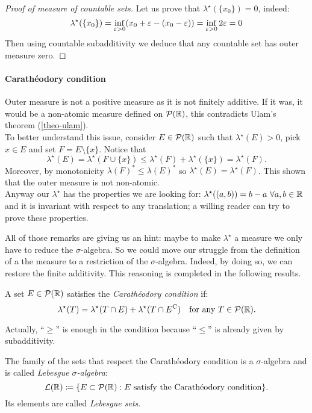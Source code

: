 \begin{proof}[Proof of measure of countable sets]
	Let us prove that $\lambda^{\star}(\{x_0\})=0$, indeed:
	$$
		\lambda^{\star}(\{x_0\})=\inf_{\varepsilon>0}(x_0+\varepsilon-(x_0-\varepsilon))=\inf_{\varepsilon>0}2\varepsilon=0
	$$
	Then using countable subadditivity we deduce that any countable set has outer measure zero.
\end{proof}

\paragraph{Carathéodory condition} Outer measure is not a positive measure as it is not finitely additive. If it was, it would be a non-atomic measure defined on $\mathcal P(\mathbb R)$, this contradicts Ulam's theorem (\vref{theo-ulam}).\\
To better understand this issue, consider $E \in \mathcal P(\mathbb R)$ such that $\lambda^\star(E)> 0$, pick $x \in E$ and set $F=E \setminus \{x\}$. Notice that 
$$
	\lambda^\star(E) 
	= \lambda^\star(F \cup \{x\}) \leq \lambda^\star(F) + \lambda^\star(\{x\}) 
	= \lambda^\star(F)
.
$$
Moreover, by monotonicity $\lambda(F)^* \leq \lambda(E)^*$ so $\lambda^\star(E) = \lambda^\star(F)$. This shown that the outer measure is not non-atomic.\\
Anyway our $\lambda^\star$ has the properties we are looking for: $\lambda^\star((a,b))  = b - a \ \forall a , b \in \mathbb R$ and it is invariant with respect to any translation; a willing reader can try to prove these properties.

All of those remarks are giving us an hint: maybe to make $\lambda^\star$ a measure we only have to reduce the $\sigma$-algebra. So we could move our struggle from the definition of a the measure to a restriction of the $\sigma$-algebra. Indeed, by doing so, we can restore the finite additivity. This reasoning is completed in the following results.

\begin{defn}
	A set $E \in \mathcal P(\mathbb R)$ satisfies the \emph{Carathéodory condition} if:
	$$
		\lambda^\star(T)
		= \lambda^\star(T\cap E) + \lambda^\star(T\cap E^{\mathrm{C}}) 
		\quad \text{for any } T \in \mathcal P(\mathbb R)
	.
	$$
\end{defn}
Actually, ``$\ge$'' is enough in the condition because ``$\le$'' is already given by subadditivity.

\begin{defn}\label{Lebesgue-sets}
	The family of the sets that respect the Carathéodory condition is a $\sigma$-algebra and is called \emph{Lebesgue $\sigma$-algebra}:
	$$\mathcal L(\mathbb R) \coloneqq \{E \subset \mathcal P(\mathbb R) : E \text{ satisfy the Carathéodory condition}\}.$$
	Its elements are called \emph{Lebesgue sets}\footnotemark{}.
\end{defn}

